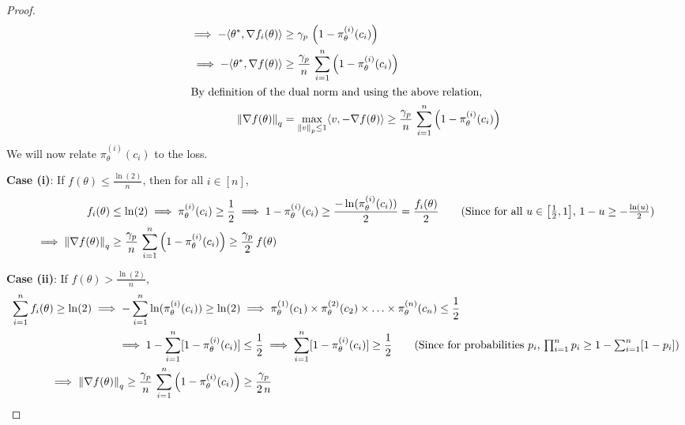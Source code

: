 \documentclass{article}
\newcommand{\norm}[1]{\left\|#1 \right\|}
\begin{document}
\begin{proof}
\begin{align*}
\implies -\langle \theta^*, \nabla f_i(\theta) \rangle & \geq \gamma_p \, \left(1 -  \pi_\theta^{(i)}(c_{i}) \right) \\
\implies -\langle \theta^*, \nabla f(\theta) \rangle & \geq \frac{\gamma_p}{n} \,  \sum_{i = 1}^{n} \left(1 -  \pi_\theta^{(i)}(c_{i}) \right) \\
\intertext{By definition of the dual norm and using the above relation,}
\norm{\nabla f(\theta)}_{q} &= \max_{\norm{v}_p \leq 1} \langle v, -\nabla f(\theta) \rangle \geq \frac{\gamma_p}{n} \,  \sum_{i = 1}^{n} \left(1 -  \pi_\theta^{(i)}(c_{i}) \right)
\end{align*}
We will now relate $\pi_\theta^{(i)}(c_{i})$ to the loss. 

\textbf{Case (i)}: If $f(\theta) \leq \frac{\ln(2)}{n}$, then for all $i \in [n]$, 
\begin{align*}
f_i(\theta) & \leq \ln(2) \implies \pi_\theta^{(i)}(c_{i}) \geq \frac{1}{2} \implies 1 -  \pi_\theta^{(i)}(c_{i}) \geq \frac{-\ln(\pi_\theta^{(i)}(c_{i}))}{2} = \frac{f_i(\theta)}{2}  \tag{Since for all $u \in \left[\frac{1}{2},1\right]$, $1 - u \geq -\frac{\ln(u)}{2}$} \\
\implies \norm{\nabla f(\theta)}_{q} & \geq \frac{\gamma_p}{n} \,  \sum_{i = 1}^{n} \left(1 -  \pi_\theta^{(i)}(c_{i}) \right) \geq \frac{\gamma_p}{2} \, f(\theta)   
\end{align*}

\textbf{Case (ii)}: If $f(\theta) > \frac{\ln(2)}{n}$, 
\begin{align*}
\sum_{i = 1}^{n} f_i(\theta) \geq \ln(2) \implies - \sum_{i = 1}^{n} \ln(\pi_\theta^{(i)}(c_i)) \geq \ln(2)  & \implies \pi_\theta^{(1)}(c_1) \times \pi_\theta^{(2)}(c_2)  \times \ldots \times \pi_\theta^{(n)}(c_n) \leq \frac{1}{2} \\
\implies 1 - \sum_{i = 1}^{n} [1 - \pi_\theta^{(i)}(c_i)] & \leq \frac{1}{2} \implies \sum_{i = 1}^{n} [1 - \pi_\theta^{(i)}(c_i)] \geq \frac{1}{2} \tag{Since for probabilities $p_i$, $\prod_{i = 1}^{n} p_i \geq 1 - \sum_{i = 1}^{n} [1 - p_i]$} \\
\implies \norm{\nabla f(\theta)}_{q} \geq \frac{\gamma_p}{n} \,  \sum_{i = 1}^{n} \left(1 -  \pi_\theta^{(i)}(c_{i}) \right) & \geq \frac{\gamma_p}{2 \, n}
\end{align*}
 \end{proof}
\end{document}
